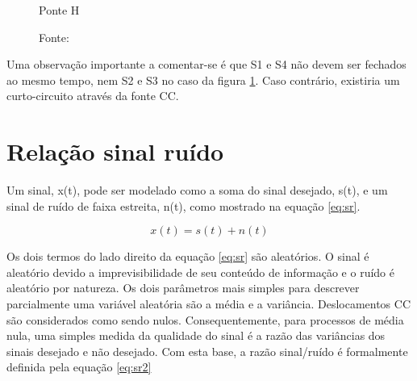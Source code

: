 \begin{figure}[H]
    \centering
     \caption{Ponte H}
     \caption*{Fonte:\cite{hart2011power}}\label{fig:ponteh1}
\end{figure}

Uma observação importante a comentar-se é que S1 e S4 não devem ser fechados ao mesmo tempo, nem S2 e S3 no caso da figura \ref{fig:ponteh1}. Caso contrário, existiria um curto-circuito através da fonte CC. \cite{hart2011power}

\section{Relação sinal ruído}

Um sinal, x(t), pode ser modelado como a soma do sinal desejado, s(t), e um sinal de ruído de faixa estreita, n(t), como mostrado na equação \ref{eq:sr}. \cite{haykinintrodução}

\begin{equation}
    \label{eq:sr}
    x(t) = s(t) + n(t)
\end{equation}

Os dois termos do lado direito da equação \ref{eq:sr} são aleatórios. O sinal é aleatório devido a imprevisibilidade de seu conteúdo de informação e o ruído é aleatório por natureza. Os dois parâmetros mais simples para descrever parcialmente uma variável aleatória são a média e a variância. Deslocamentos CC são considerados como sendo nulos. Consequentemente, para processos de média nula, uma simples medida da qualidade do sinal é a razão das variâncias dos sinais desejado e não desejado. Com esta base, a razão sinal/ruído é formalmente definida pela equação \ref{eq:sr2} \cite{haykinintrodução}

